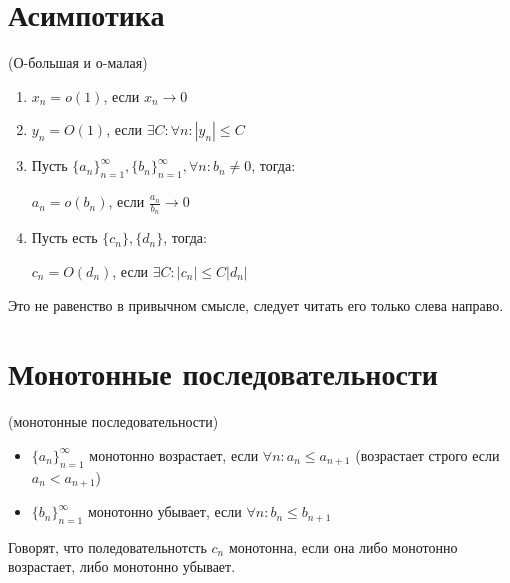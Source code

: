 \section{Асимпотика}

\begin{definition} (О-большая и о-малая)
    \begin{enumerate}
        \item $x_n = o(1)$, если $x_n \to 0$
        \item $y_n = O(1)$, если $\exists C: \forall n: |y_n| \leq C$
        \item Пусть $\{a_n\}_{n=1}^\infty,\{b_n\}_{n=1}^\infty, \forall n: b_n \neq 0$, тогда:
        
        $a_n = o(b_n)$, если $\frac{a_n}{b_n} \to 0$

        \item Пусть есть $\{c_n\}, \{d_n\}$, тогда:
        
        $c_n = O(d_n)$, если $\exists C: |c_n| \leq C|d_n|$

    \end{enumerate}

\end{definition}

\begin{remark}
    Это не равенство в привычном смысле, следует читать его только слева направо.
\end{remark}

\section{Монотонные последовательности}

\begin{definition}(монотонные последовательности)
    \begin{itemize}
        \item $\{a_n\}_{n=1}^\infty $ монотонно возрастает, если $\forall n: a_n \leq a_{n+1}$ (возрастает строго если $a_n < a_{n+1}$)
        \item $\{b_n\}_{n=1}^\infty $ монотонно убывает, если $\forall n: b_n \leq b_{n+1}$
    \end{itemize}
\end{definition}

\begin{remark}
    Говорят, что поледовательнотсть $c_n$ монотонна, если она либо монотонно возрастает, либо монотонно убывает.
\end{remark}

